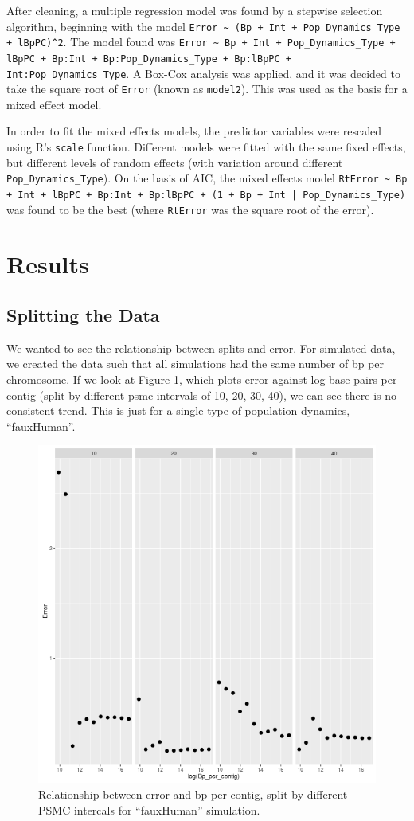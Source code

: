 \documentclass[11pt,a4paper]{article}
\begin{document}
After cleaning, a multiple regression model was found by a stepwise selection algorithm, beginning with the model \verb|Error ~ (Bp + Int + Pop_Dynamics_Type + lBpPC)^2|. The model found was \verb|Error ~ Bp + Int + Pop_Dynamics_Type + lBpPC + Bp:Int + Bp:Pop_Dynamics_Type + Bp:lBpPC + Int:Pop_Dynamics_Type|. A Box-Cox analysis was applied, and it was decided to take the square root of \verb|Error| (known as \verb|model2|). This was used as the basis for a mixed effect model.

In order to fit the mixed effects models, the predictor variables were rescaled using R's \verb|scale| function. Different models were fitted with the same fixed effects, but different levels of random effects (with variation around different \verb|Pop_Dynamics_Type|). On the basis of AIC, the mixed effects model \verb;RtError ~ Bp + Int + lBpPC + Bp:Int + Bp:lBpPC + (1 + Bp + Int | Pop_Dynamics_Type); was found to be the best (where \verb|RtError| was the square root of the error).



\section{Results}

\subsection{Splitting the Data}
We wanted to see the relationship between splits and error. For simulated data, we created the data such that all simulations had the same number of bp per chromosome. If we look at Figure \ref{fauxHumanErrorVsBpWithIntGrid}, which plots error against log base pairs per contig (split by different psmc intervals of 10, 20, 30, 40), we can see there is no consistent trend. This is just for a single type of population dynamics, ``fauxHuman''.

\begin{figure}[h]
  \center
  \includegraphics[width=.7\linewidth]{figures/fauxHumanErrorVsBpWithIntGrid.png}
  \caption{Relationship between error and bp per contig, split by different PSMC intercals for ``fauxHuman'' simulation.}\label{fauxHumanErrorVsBpWithIntGrid}
\end{figure}
\end{document}
